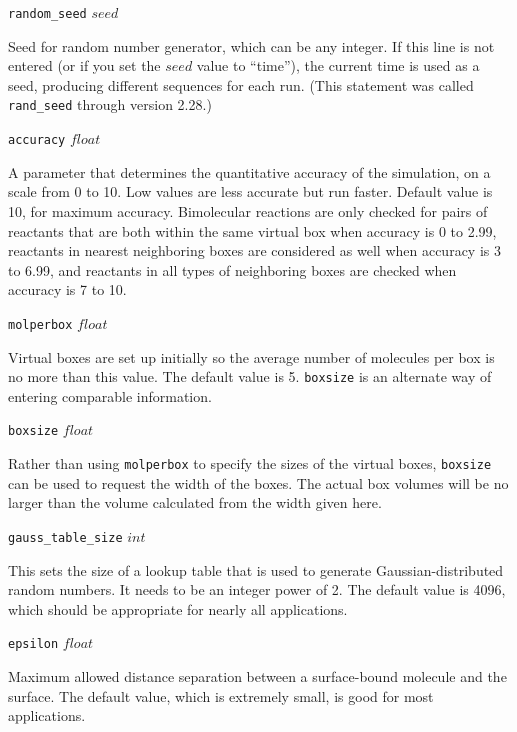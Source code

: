 \documentclass {scrbook}
\newcommand {\ttt} {\texttt}
\begin{document}
\begin{description}

\item{\ttt{random\_seed} $seed$}

Seed for random number generator, which can be any integer. If this line is not entered (or if you set the $seed$ value to ``time''), the current time is used as a seed, producing different sequences for each run. (This statement was called \ttt{rand\_seed} through version 2.28.)

\item{\ttt{accuracy} $float$}

A parameter that determines the quantitative accuracy of the simulation, on a scale from 0 to 10. Low values are less accurate but run faster. Default value is 10, for maximum accuracy. Bimolecular reactions are only checked for pairs of reactants that are both within the same virtual box when accuracy is 0 to 2.99, reactants in nearest neighboring boxes are considered as well when accuracy is 3 to 6.99, and reactants in all types of neighboring boxes are checked when accuracy is 7 to 10.

\item{\ttt{molperbox} $float$}

Virtual boxes are set up initially so the average number of molecules per box is no more than this value. The default value is 5. \ttt{boxsize} is an alternate way of entering comparable information.

\item{\ttt{boxsize} $float$}

Rather than using \ttt{molperbox} to specify the sizes of the virtual boxes, \ttt{boxsize} can be used to request the width of the boxes. The actual box volumes will be no larger than the volume calculated from the width given here.

\item{\ttt{gauss\_table\_size} $int$}

This sets the size of a lookup table that is used to generate Gaussian-distributed random numbers. It needs to be an integer power of 2. The default value is 4096, which should be appropriate for nearly all applications.

\item{\ttt{epsilon} $float$}

Maximum allowed distance separation between a surface-bound molecule and the surface. The default value, which is extremely small, is good for most applications.


\end{description}
\end{document}
